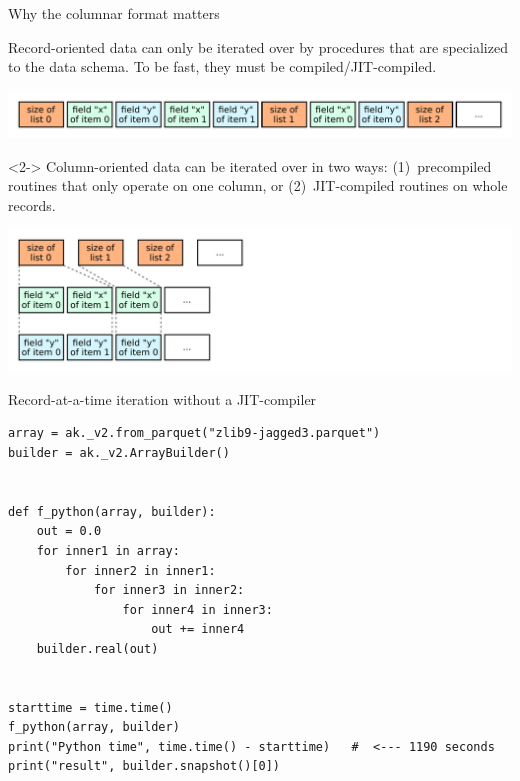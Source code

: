 \documentclass[aspectratio=169]{beamer}
\begin{document}
\begin{frame}{Why the columnar format matters}
\vspace{0.35 cm}
\large

Record-oriented data can only be iterated over by procedures that are specialized to the data schema. To be fast, they must be compiled/JIT-compiled.

\includegraphics[width=\linewidth]{record-oriented.pdf}

\vspace{0.15 cm}
\begin{uncoverenv}<2->
Column-oriented data can be iterated over in two ways: (1)~precompiled routines that only operate on one column, or (2)~JIT-compiled routines on whole records.

\includegraphics[width=\linewidth]{column-oriented.pdf}
\end{uncoverenv}

\vspace{-4 cm}
\hfill \begin{minipage}{0.48\linewidth}

\vspace{0.25 cm}
\end{minipage}
\vspace{4 cm}
\end{frame}

\begin{frame}[fragile]{Record-at-a-time iteration without a JIT-compiler}
\vspace{0.1 cm}
\small
\begin{verbatim}
array = ak._v2.from_parquet("zlib9-jagged3.parquet")
builder = ak._v2.ArrayBuilder()


def f_python(array, builder):
    out = 0.0
    for inner1 in array:
        for inner2 in inner1:
            for inner3 in inner2:
                for inner4 in inner3:
                    out += inner4
    builder.real(out)


starttime = time.time()
f_python(array, builder)
print("Python time", time.time() - starttime)   #  <--- 1190 seconds
print("result", builder.snapshot()[0])
\end{verbatim}
\end{frame}
\end{document}
